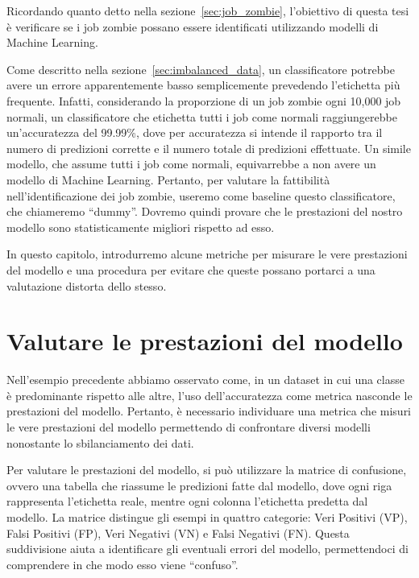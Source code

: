 \label{chap:applicazione}

Ricordando quanto detto nella sezione~\ref{sec:job_zombie}, l'obiettivo di
questa tesi è verificare se i job zombie possano essere identificati
utilizzando modelli di Machine Learning.

Come descritto nella sezione~\ref{sec:imbalanced_data}, un classificatore
potrebbe avere un errore apparentemente basso semplicemente prevedendo
l'etichetta più frequente. Infatti, considerando la proporzione di un job
zombie ogni 10,000 job normali, un classificatore che etichetta tutti i job
come normali raggiungerebbe un'accuratezza del 99.99\%, dove per accuratezza
si intende il rapporto tra il numero di predizioni corrette e il numero totale
di predizioni effettuate. Un simile modello, che assume tutti i job come
normali, equivarrebbe a non avere un modello di Machine Learning. Pertanto,
per valutare la fattibilità nell'identificazione dei job zombie, useremo come
baseline questo classificatore, che chiameremo ``dummy''. Dovremo quindi
provare che le prestazioni del nostro modello sono statisticamente migliori
rispetto ad esso.

In questo capitolo, introdurremo alcune metriche per misurare le vere
prestazioni del modello e una procedura per evitare che queste possano
portarci a una valutazione distorta dello stesso.

\section{Valutare le prestazioni del modello}

Nell'esempio precedente abbiamo osservato come, in un dataset in cui una
classe è predominante rispetto alle altre, l'uso dell'accuratezza come metrica
nasconde le prestazioni del modello. Pertanto, è necessario individuare una
metrica che misuri le vere prestazioni del modello permettendo di confrontare
diversi modelli nonostante lo sbilanciamento dei dati.

Per valutare le prestazioni del modello, si può utilizzare la matrice di
confusione, ovvero una tabella che riassume le predizioni fatte dal modello,
dove ogni riga rappresenta l'etichetta reale, mentre ogni colonna l'etichetta
predetta dal modello. La matrice distingue gli esempi in quattro categorie:
Veri Positivi (VP), Falsi Positivi (FP), Veri Negativi (VN) e Falsi Negativi
(FN). Questa suddivisione aiuta a identificare gli eventuali errori del
modello, permettendoci di comprendere in che modo esso viene ``confuso''.

